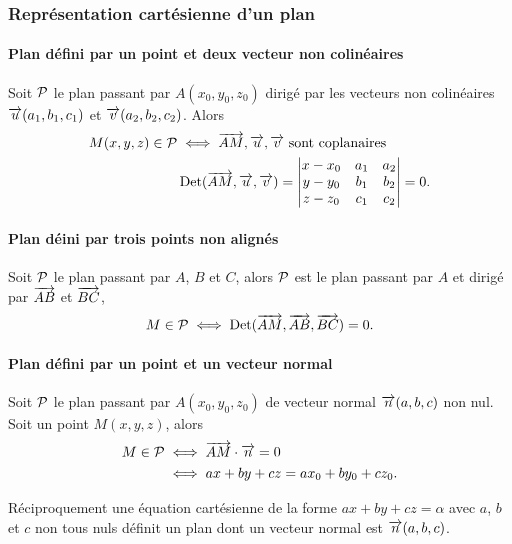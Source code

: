 \subsubsection{Représentation cartésienne d'un plan}

\paragraph{Plan défini par un point et deux vecteur non colinéaires}

Soit \(\P\) le plan passant par \(A(x_0,y_0,z_0)\) dirigé par les vecteurs non colinéaires \(\vu(a_1,b_1,c_1)\) et \(\vv(a_2,b_2,c_2)\). Alors
\begin{align}
  M(x,y,z) \in \P &\iff  \vect{AM}, \vu, \vv \text{~sont coplanaires}\\
  &\Det(\vect{AM},\vu,\vv)=\begin{vmatrix} x-x_0 & a_1 & a_2 \\ y-y_0 & b_1 & b_2 \\ z-z_0 & c_1 & c_2\end{vmatrix}=0.
\end{align}

\paragraph{Plan déini par trois points non alignés}

Soit \(\P\) le plan passant par \(A\), \(B\) et \(C\), alors \(\P\) est le plan passant par \(A\) et dirigé par \(\vect{AB}\) et \(\vect{BC}\),
\begin{equation}
  M \in \P \iff \Det(\vect{AM},\vect{AB},\vect{BC})=0.
\end{equation}

\paragraph{Plan défini par un point et un vecteur normal}

Soit \(\P\) le plan passant par \(A(x_0,y_0,z_0)\) de vecteur normal \(\vect{n}(a,b,c)\) non nul. Soit un point \(M(x,y,z)\), alors
\begin{align}
  M \in \P &\iff \vect{AM}\cdot\vect{n}=0 \\
  &\iff ax+by+cz=ax_0+by_0+cz_0.
\end{align}

Réciproquement une équation cartésienne de la forme \(ax+by+cz=\alpha\) avec \(a\), \(b\) et \(c\) non tous nuls définit un plan dont un vecteur normal est \(\vect{n}(a,b,c)\).

